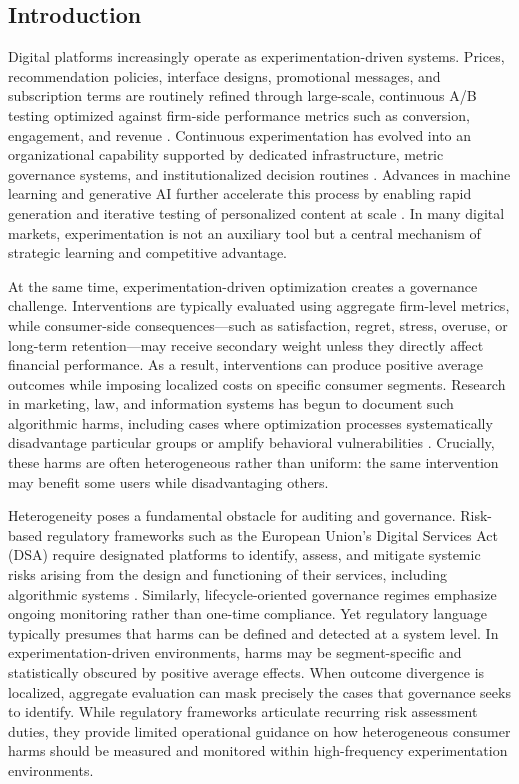 \documentclass[11pt,letterpaper,english]{article}
\theoremstyle{definition}
\theoremstyle{definition}
\begin{document}
\begin{bibunit}
\newpage

\section{Introduction}
\label{sec:intro}

Digital platforms increasingly operate as experimentation-driven systems. Prices, recommendation policies, interface designs, promotional messages, and subscription terms are routinely refined through large-scale, continuous A/B testing optimized against firm-side performance metrics such as conversion, engagement, and revenue \citep{kohavi2020trustworthy}. Continuous experimentation has evolved into an organizational capability supported by dedicated infrastructure, metric governance systems, and institutionalized decision routines \citep{auer2021_continuous_experimentation, quinn2024_ab_slr, dmitriev2021_ab_flywheel}. Advances in machine learning and generative AI further accelerate this process by enabling rapid generation and iterative testing of personalized content at scale \citep{ye2025lola}. In many digital markets, experimentation is not an auxiliary tool but a central mechanism of strategic learning and competitive advantage.

At the same time, experimentation-driven optimization creates a governance challenge. Interventions are typically evaluated using aggregate firm-level metrics, while consumer-side consequences—such as satisfaction, regret, stress, overuse, or long-term retention—may receive secondary weight unless they directly affect financial performance. As a result, interventions can produce positive average outcomes while imposing localized costs on specific consumer segments. Research in marketing, law, and information systems has begun to document such algorithmic harms, including cases where optimization processes systematically disadvantage particular groups or amplify behavioral vulnerabilities \citep{bar2023algorithmic, lambrecht2019algorithmic}. Crucially, these harms are often heterogeneous rather than uniform: the same intervention may benefit some users while disadvantaging others.

Heterogeneity poses a fundamental obstacle for auditing and governance. Risk-based regulatory frameworks such as the European Union’s Digital Services Act (DSA) require designated platforms to identify, assess, and mitigate systemic risks arising from the design and functioning of their services, including algorithmic systems \citep{dsa2022article34}. Similarly, lifecycle-oriented governance regimes emphasize ongoing monitoring rather than one-time compliance. Yet regulatory language typically presumes that harms can be defined and detected at a system level. In experimentation-driven environments, harms may be segment-specific and statistically obscured by positive average effects. When outcome divergence is localized, aggregate evaluation can mask precisely the cases that governance seeks to identify. While regulatory frameworks articulate recurring risk assessment duties, they provide limited operational guidance on how heterogeneous consumer harms should be measured and monitored within high-frequency experimentation environments.


\end{bibunit}
\end{document}
